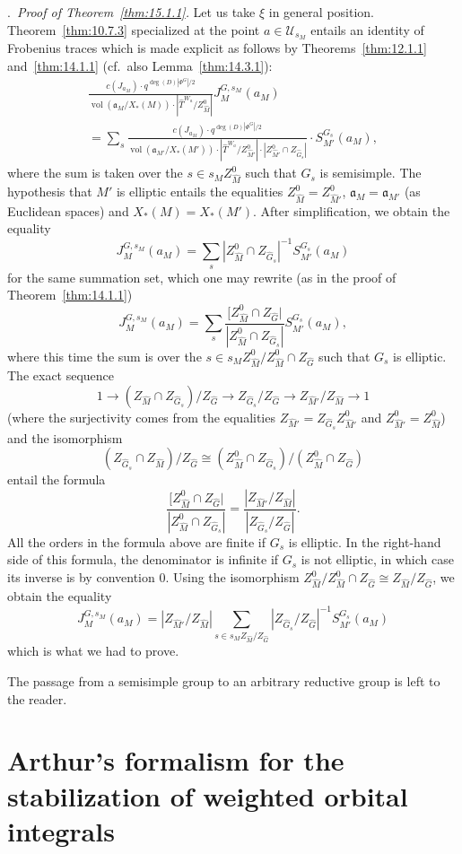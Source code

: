 \documentclass[12pt,a4paper,oneside,english,leqno]{smfart}
\makeatletter
\numberwithin{equation}{subsection}
\numberwithin{theo}{subsection}
\newenvironment{paragr}[1][]{\medskip\refstepcounter{subsection}%
  \par\noindent\hspace*{\parindent}\thesubsection.\ \emph{#1}%
  \@ifundefined{@empty}{}{}\ignorespaces}{\medskip}
\theoremstyle{plain}
\theoremstyle{definition}
\theoremstyle{remark}
\DeclareMathOperator{\vol}{vol}
\newcommand{\uc}{\mathcal{U}}
\newcommand{\Gc}{\widehat{G}}
\newcommand{\Tc}{\widehat{T}}
\newcommand{\Mc}{\widehat{M}}
\newcommand{\ago}{\mathfrak{a}}
\makeatother
\begin{document}
\begin{paragr}[Proof of Theorem~\ref{thm:15.1.1}.]
Let us take $\xi$ in general position. Theorem~\ref{thm:10.7.3} specialized at the point $a\in\uc_{s_M}$ entails an identity of Frobenius traces which is made explicit as follows by Theorems~\ref{thm:12.1.1} and~\ref{thm:14.1.1} (cf.\ also Lemma~\ref{thm:14.3.1}):
\begin{multline*}
\frac{c(J_{a_M})\cdot q^{\deg(D)|\Phi^G|/2}}
{\vol(\ago_M/X_*(M))\cdot|\Tc^{W_a}/Z_{\Mc}^0|}J_M^{G,s_M}(a_M)\\
=\sum_s\frac{c(J_{a_M})\cdot q^{\deg(D)|\Phi^G|/2}}
{\vol(\ago_{M'}/X_*(M'))\cdot|\Tc^{W_a}/Z_{\Mc'}^0|\cdot
|Z_{\Mc'}^0\cap Z_{\Gc_s}|}\cdot S_{M'}^{G_s}(a_M),
\end{multline*}
where the sum is taken over the $s\in s_M Z_{\Mc}^0$ such that $G_s$ is semisimple. The hypothesis that $M'$ is elliptic entails the equalities $Z_{\Mc}^0=Z_{\Mc'}^0$, $\ago_M=\ago_{M'}$ (as Euclidean spaces) and $X_*(M)=X_*(M')$. After simplification, we obtain the equality
$$
J_M^{G,s_M}(a_M)=\sum_s|Z_{\Mc}^0\cap Z_{\Gc_s}|^{-1}S_{M'}^{G_s}(a_M)
$$
for the same summation set, which one may rewrite (as in the proof of Theorem~\ref{thm:14.1.1})
$$
J_M^{G,s_M}(a_M)=\sum_s\frac{[Z_{\Mc}^0\cap Z_{\Gc}|} {|Z_{\Mc}^0\cap Z_{\Gc_s}|}S_{M'}^{G_s}(a_M),
$$
where this time the sum is over the $s\in s_M Z_{\Mc}^0/Z_{\Mc}^0\cap Z_{\Gc}$ such that $G_s$ is elliptic. The exact sequence
$$
1\longrightarrow(Z_{\Mc}\cap Z_{\Gc_s})/Z_{\Gc}\longrightarrow Z_{\Gc_s}/Z_{\Gc}\longrightarrow Z_{\Mc'}/Z_{\Mc}\longrightarrow 1
$$
(where the surjectivity comes from the equalities $Z_{\Mc'}=Z_{\Gc_s}Z_{\Mc'}^0$ and $Z_{\Mc'}^0=Z_{\Mc}^0$) and the isomorphism
$$
(Z_{\Gc_s}\cap Z_{\Mc})/Z_{\Gc}\cong (Z_{\Mc}^0\cap Z_{\Gc_s})/(Z_{\Mc}^0\cap Z_{\Gc})
$$
entail the formula
$$
\frac{[Z_{\Mc}^0\cap Z_{\Gc}|}{|Z_{\Mc}^0\cap Z_{\Gc_s}|} =\frac{|Z_{\Mc'}/Z_{\Mc}|}{|Z_{\Gc_s}/Z_{\Gc}|}.
$$
All the orders in the formula above are finite if $G_s$ is elliptic. In the right-hand side of this formula, the denominator is infinite if $G_s$ is not elliptic, in which case its inverse is by convention $0$. Using the isomorphism $Z_{\Mc}^0/Z_{\Mc}^0\cap Z_{\Gc}\cong Z_{\Mc}/Z_{\Gc}$, we obtain the equality
$$
J_M^{G,s_M}(a_M)=|Z_{\Mc'}/Z_{\Mc}|\sum_{s\in s_M Z_{\Mc}/Z_{\Gc}} |Z_{\Gc_s}/Z_{\Gc}|^{-1}S_{M'}^{G_s}(a_M)
$$
which is what we had to prove.

The passage from a semisimple group to an arbitrary reductive group is left to the reader.
\end{paragr}

\section{Arthur's formalism for the stabilization of weighted orbital integrals}\label{sec:16}
\end{document}
